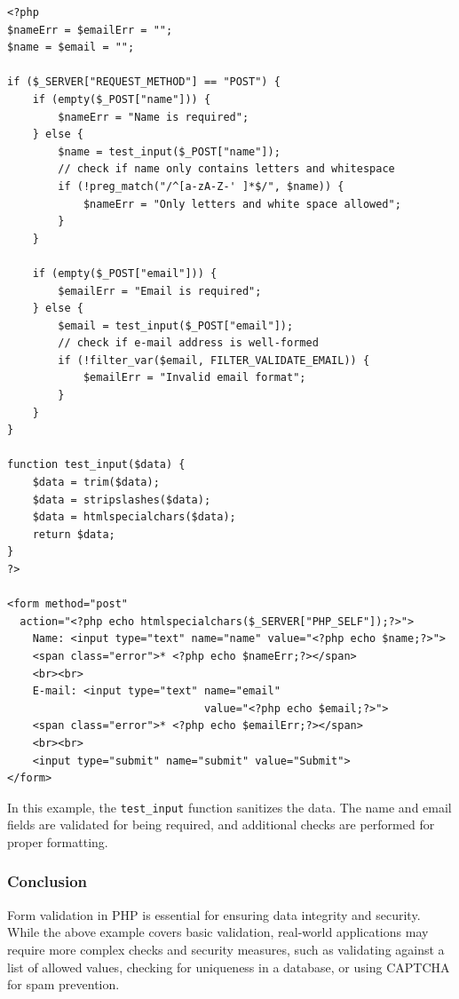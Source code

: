 \documentclass[11pt]{article}
\begin{document}
\begin{verbatim}
<?php
$nameErr = $emailErr = "";
$name = $email = "";

if ($_SERVER["REQUEST_METHOD"] == "POST") {
    if (empty($_POST["name"])) {
        $nameErr = "Name is required";
    } else {
        $name = test_input($_POST["name"]);
        // check if name only contains letters and whitespace
        if (!preg_match("/^[a-zA-Z-' ]*$/", $name)) {
            $nameErr = "Only letters and white space allowed";
        }
    }

    if (empty($_POST["email"])) {
        $emailErr = "Email is required";
    } else {
        $email = test_input($_POST["email"]);
        // check if e-mail address is well-formed
        if (!filter_var($email, FILTER_VALIDATE_EMAIL)) {
            $emailErr = "Invalid email format";
        }
    }
}

function test_input($data) {
    $data = trim($data);
    $data = stripslashes($data);
    $data = htmlspecialchars($data);
    return $data;
}
?>

<form method="post"
  action="<?php echo htmlspecialchars($_SERVER["PHP_SELF"]);?>">
    Name: <input type="text" name="name" value="<?php echo $name;?>">
    <span class="error">* <?php echo $nameErr;?></span>
    <br><br>
    E-mail: <input type="text" name="email"
                               value="<?php echo $email;?>">
    <span class="error">* <?php echo $emailErr;?></span>
    <br><br>
    <input type="submit" name="submit" value="Submit">
</form>
\end{verbatim}

In this example, the \texttt{test\_input} function sanitizes the data. The name
and email fields are validated for being required, and additional checks
are performed for proper formatting.


\subsubsection{Conclusion}
\label{sec:org41f11b9}
Form validation in PHP is essential for ensuring data integrity and
security. While the above example covers basic validation, real-world
applications may require more complex checks and security measures, such
as validating against a list of allowed values, checking for uniqueness
in a database, or using CAPTCHA for spam prevention.
\end{document}
